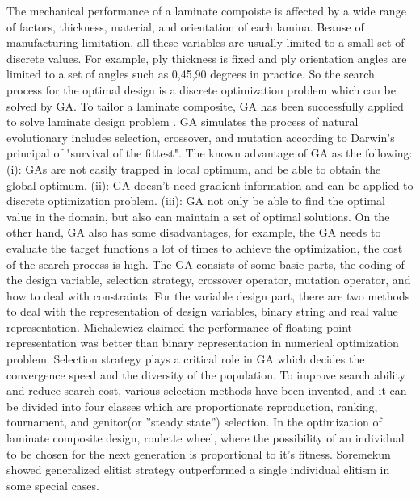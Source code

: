 \documentclass[Afour,sagev,times]{sagej}
\begin{document}
The mechanical performance of a laminate compoiste is affected by a wide range of factors,
thickness, material, and orientation of each lamina. Beause of manufacturing limitation, all these
variables are usually limited to a small set of discrete values. For example, ply thickness is fixed 
and ply orientation angles are limited to a set of angles such as 0,45,90 degrees in practice. So the search process for the
optimal design is a discrete optimization problem which can be solved by GA.
To tailor a laminate composite, GA has been successfully
applied to solve laminate design
problem \cite{riche1993optimization,nagendra1996improved,sadagopan1998application,todoroki1998stacking,liu2000permutation,sivakumar1998optimum,walker2003technique,lin2004stacking,kang2005minimum,murugan2007target,akbulut2008optimum}.
GA simulates the process of natural evolutionary includes selection, crossover, 
and mutation according to Darwin's principal of "survival of the fittest".
The known advantage of GA as the following: (i): GAs are not easily trapped in local
optimum, and be able to obtain the global optimum. (ii): GA doesn't need
gradient information and can be applied to discrete optimization problem.
(iii): GA not only be able to find the optimal value in the domain, but also
can maintain a set of optimal solutions. On the other hand, GA also has some disadvantages, 
for example,  the GA needs to evaluate the target functions a lot of times to achieve the
optimization, the cost of the search process is high. The GA consists of some basic parts, the
coding of the design variable, selection strategy, crossover operator, mutation operator, and how to
deal with  constraints.  For the variable design part,  there are two methods to deal with the
representation of design variables, binary string and real value
representation\cite{riche1993optimization,todoroki1998stacking}.
Michalewicz\cite{zbigniew1996genetic} claimed the performance of floating point representation  was
better than binary representation in numerical optimization problem. Selection strategy plays a
critical role in GA which decides the convergence speed and the diversity of the population.  To
improve search ability and reduce search cost, various selection methods have been invented,
and it can be divided into four classes which are proportionate reproduction,
ranking, tournament, and genitor(or ”steady state”) selection. In the optimization of laminate
composite design, roulette wheel\cite{riche1993optimization,seresta2007optimal}, where the
possibility of an individual to be chosen for the next generation is proportional to it's
fitness.  Soremekun \cite{soremekun2001composite} showed generalized elitist strategy outperformed a
single individual elitism in some special cases.
\end{document}
